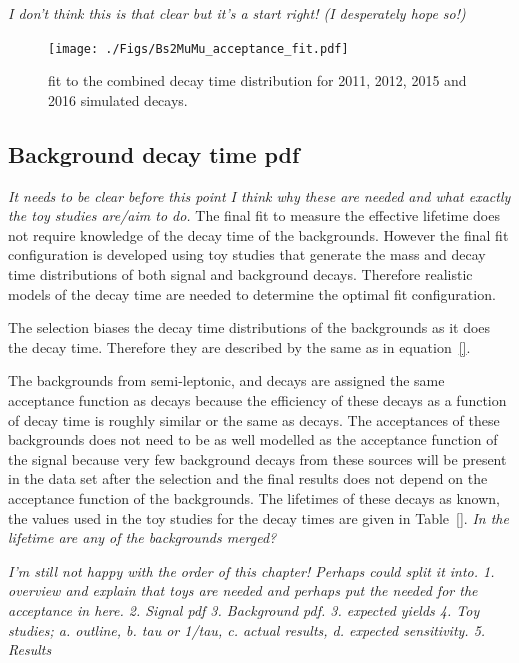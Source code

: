 {{\it I don't think this is that clear but it's a start right! (I desperately hope so!)}



\begin{figure}[htbp]
    \centering
        \texttt{[image: ./Figs/Bs2MuMu\_acceptance\_fit.pdf]}
    \caption{\ml fit to the combined decay time distribution for 2011, 2012, 2015 and 2016 simulated \bsmumu decays. }
    \label{fig:accptfit}
\end{figure}




\subsection{Background decay time pdf}
\label{sec:bkgDTpdf}
{\it It needs to be clear before this point I think why these are needed and what exactly the toy studies are/aim to do.}
The final fit to measure the \bsmumu effective lifetime does not require knowledge of the decay time \pdfs of the backgrounds. However the final fit configuration is developed using toy studies that generate the mass and decay time distributions of both signal and background decays. Therefore realistic models of the decay time \pdfs are needed to determine the optimal fit configuration. 


The selection biases the decay time distributions of the backgrounds as it does the \bsmumu decay time. Therefore they are described by the same \pdfs as in equation~\ref{}. 

The backgrounds from semi-leptonic, \bhh and \bdmumu decays are assigned the same acceptance function as \bsmumu decays because the efficiency of these decays as a function of decay time is roughly similar or the same as \bsmumu decays. The acceptances of these backgrounds does not need to be as well modelled as the acceptance function of the signal because very few background decays from these sources will be present in the data set after the selection and the final results does not depend on the acceptance function of the backgrounds. The lifetimes of these decays as known, the values used in the toy studies for the decay times \pdfs are given in Table~\ref{}. {\it In the lifetime are any of the backgrounds merged?}

{\it I'm still not happy with the order of this chapter! Perhaps could split it into. 1. overview and explain that toys are needed and perhaps put the needed for the acceptance in here. 2. Signal pdf 3. Background pdf. 3. expected yields 4. Toy studies; a. outline, b. tau or 1/tau, c. actual results, d. expected sensitivity. 5. Results}

}
